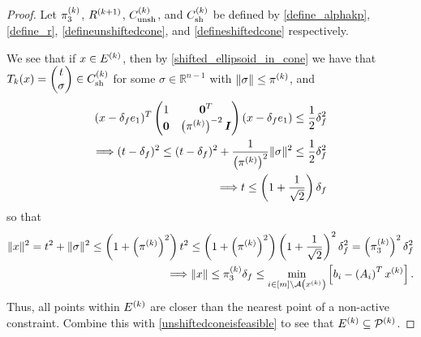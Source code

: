 \begin{proof}

Let $\pi_3^{(k)}$, ${R^{(k+1)}}$, ${C^{(k)}_{\textrm{unsh}}}$, and ${C^{(k)}_{\textrm{sh}}}$ be defined by
\cref{define_alphakp}, \cref{define_r}, \cref{defineunshiftedcone}, and \cref{defineshiftedcone}
respectively.


We see that if $x \in {E^{(k)}}$,
then by \cref{shifted_ellipsoid_in_cone} we have that $T_k(x) = \begin{pmatrix}t\\ \sigma\end{pmatrix} \in {C^{(k)}_{\textrm{sh}}}$ for some $\sigma \in \mathbb R^{n-1}$
with $\left\|\sigma\right\| \le \pi^{(k)}$, and
\begin{align*}
(x - \delta_{f} e_1)^T\begin{pmatrix}
1 & \boldsymbol0^T \\
\boldsymbol 0 & \left(\pi^{(k)}\right)^{-2} \boldsymbol I \\
\end{pmatrix}(x - \delta_{f} e_1) \le \frac 1 2 \delta_{f}^2 \\
\Longrightarrow (t - \delta_{f})^2 \le (t - \delta_{f})^2 + \frac {1} {\left(\pi^{(k)}\right)^2} \|\sigma\|^2 \le \frac 1 2 \delta_{f}^2 \\
\Longrightarrow t \le \left(1 + \frac 1 {\sqrt{2}}\right) \delta_{f}
\end{align*}
so that 
\begin{align*}
\|x\|^2 = t^2 + \|\sigma\|^2 \le \left(1 + \left(\pi^{(k)}\right)^2 \right) t^2 
\le \left(1 + \left(\pi^{(k)}\right)^2 \right) \left(1 + \frac 1 {\sqrt{2}}\right)^2 \delta_{f}^2 
= \left(\pi_3^{(k)}\right)^2 \delta_{f}^2 \\
\Longrightarrow \|x\| \le \pi_3^{(k)} \delta_{f} \le \min_{i \in [m] \setminus {\mathcal A}\left(x^{(k)}\right)} \left[{{b}}_i - \left({{A}}_i\right)^Tx^{(k)}\right].
\end{align*}
Thus, all points within ${E^{(k)}}$ are closer than the nearest point of a non-active constraint.
Combine this with \cref{unshiftedconeisfeasible} to see that ${E^{(k)}} \subseteq {{\mathcal{P}}^{(k)}}$.
\end{proof}




